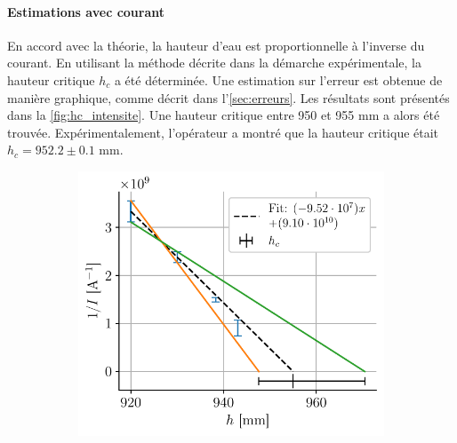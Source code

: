 \paragraph{Estimations avec courant}
En accord avec la théorie, la hauteur d'eau est proportionnelle à l'inverse du courant. En utilisant la méthode décrite dans la démarche expérimentale, la hauteur critique \(h_c\) a été déterminée. Une estimation sur l'erreur est obtenue de manière graphique, comme décrit dans l'\autoref{sec:erreurs}. Les résultats sont présentés dans la \autoref{fig:hc_intensite}. Une hauteur critique entre 950 et 955 \si{\milli\meter} a alors été trouvée. Expérimentalement, l'opérateur a montré que la hauteur critique était \(h_c = 952.2 \pm 0.1\) mm.
\begin{figure}[H]
    \centering
    \begin{subfigure}{0.48\linewidth}
        \centering
        \includegraphics[width=\linewidth]{figures/h_I_pair12.pdf}
        \caption{}
        \label{fig:hc_I_12}
    \end{subfigure}
    \begin{subfigure}{0.48\linewidth}
        \centering

\end{subfigure}
\end{figure}
